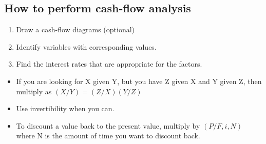     \subsection{How to perform cash-flow analysis}
    \begin{process}
        \begin{enumerate}
            \item Draw a cash-flow diagrams (optional)
            \item Identify variables with corresponding values.
            \item Find the interest rates that are appropriate for the factors.
        \end{enumerate}
    \end{process}

    \begin{intuition}
        \begin{itemize}
            \item If you are looking for X given Y, but you have Z given X and Y given Z, then multiply as $(X/Y)=(Z/X)(Y/Z)$
            \item Use invertibility when you can.
            \item To discount a value back to the present value, multiply by $(P/F,i,N)$ where N is the amount of time you want to discount back.
        \end{itemize}
    \end{intuition}

